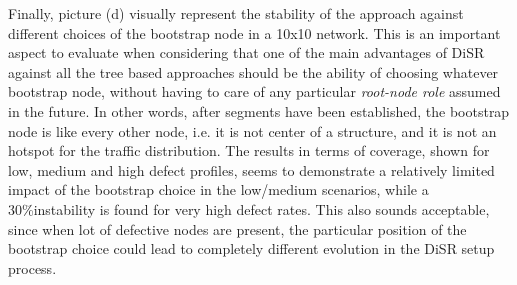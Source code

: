 Finally, picture (d) visually represent  the stability of the approach
against different choices of the bootstrap node in a 10x10 network.
This is an important aspect to evaluate when considering that one of
the main advantages of DiSR against all the tree based approaches
should be the ability of choosing whatever bootstrap node, without
having to care of any particular \emph{root-node role} assumed in the future.
In other words, after segments have been established, the bootstrap node
is like every other node, i.e. it is not center of a structure, and it
is not an hotspot for the traffic distribution. The results in terms
of coverage,  shown for low, medium and high defect profiles, seems to
demonstrate a relatively limited impact of the bootstrap choice in
the low/medium scenarios, while a 30\%instability is found for very high defect
rates. This also sounds acceptable, since when lot of defective nodes
are present, the particular position of the bootstrap choice could
lead to completely different evolution in the DiSR setup process.



